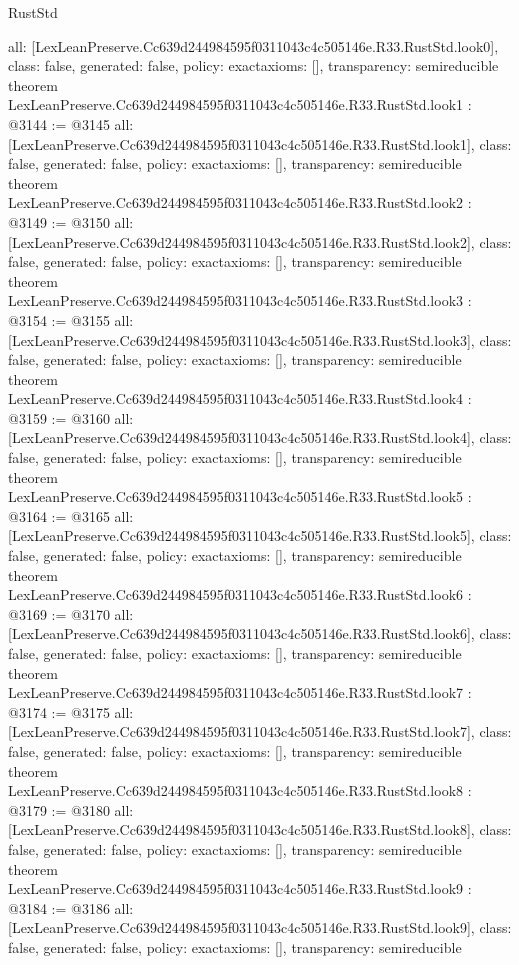 \begin{lexlean}{RustStd}
\begin{coremodule}
{  all: [LexLeanPreserve.Cc639d244984595f0311043c4c505146e.R33.RustStd.look0],
  class: false,
  generated: false,
  policy: exact{axioms: []},
  transparency: semireducible
}
theorem LexLeanPreserve.Cc639d244984595f0311043c4c505146e.R33.RustStd.look1 : @3144 := @3145 {
  all: [LexLeanPreserve.Cc639d244984595f0311043c4c505146e.R33.RustStd.look1],
  class: false,
  generated: false,
  policy: exact{axioms: []},
  transparency: semireducible
}
theorem LexLeanPreserve.Cc639d244984595f0311043c4c505146e.R33.RustStd.look2 : @3149 := @3150 {
  all: [LexLeanPreserve.Cc639d244984595f0311043c4c505146e.R33.RustStd.look2],
  class: false,
  generated: false,
  policy: exact{axioms: []},
  transparency: semireducible
}
theorem LexLeanPreserve.Cc639d244984595f0311043c4c505146e.R33.RustStd.look3 : @3154 := @3155 {
  all: [LexLeanPreserve.Cc639d244984595f0311043c4c505146e.R33.RustStd.look3],
  class: false,
  generated: false,
  policy: exact{axioms: []},
  transparency: semireducible
}
theorem LexLeanPreserve.Cc639d244984595f0311043c4c505146e.R33.RustStd.look4 : @3159 := @3160 {
  all: [LexLeanPreserve.Cc639d244984595f0311043c4c505146e.R33.RustStd.look4],
  class: false,
  generated: false,
  policy: exact{axioms: []},
  transparency: semireducible
}
theorem LexLeanPreserve.Cc639d244984595f0311043c4c505146e.R33.RustStd.look5 : @3164 := @3165 {
  all: [LexLeanPreserve.Cc639d244984595f0311043c4c505146e.R33.RustStd.look5],
  class: false,
  generated: false,
  policy: exact{axioms: []},
  transparency: semireducible
}
theorem LexLeanPreserve.Cc639d244984595f0311043c4c505146e.R33.RustStd.look6 : @3169 := @3170 {
  all: [LexLeanPreserve.Cc639d244984595f0311043c4c505146e.R33.RustStd.look6],
  class: false,
  generated: false,
  policy: exact{axioms: []},
  transparency: semireducible
}
theorem LexLeanPreserve.Cc639d244984595f0311043c4c505146e.R33.RustStd.look7 : @3174 := @3175 {
  all: [LexLeanPreserve.Cc639d244984595f0311043c4c505146e.R33.RustStd.look7],
  class: false,
  generated: false,
  policy: exact{axioms: []},
  transparency: semireducible
}
theorem LexLeanPreserve.Cc639d244984595f0311043c4c505146e.R33.RustStd.look8 : @3179 := @3180 {
  all: [LexLeanPreserve.Cc639d244984595f0311043c4c505146e.R33.RustStd.look8],
  class: false,
  generated: false,
  policy: exact{axioms: []},
  transparency: semireducible
}
theorem LexLeanPreserve.Cc639d244984595f0311043c4c505146e.R33.RustStd.look9 : @3184 := @3186 {
  all: [LexLeanPreserve.Cc639d244984595f0311043c4c505146e.R33.RustStd.look9],
  class: false,
  generated: false,
  policy: exact{axioms: []},
  transparency: semireducible
}
\end{coremodule}
\end{lexlean}
